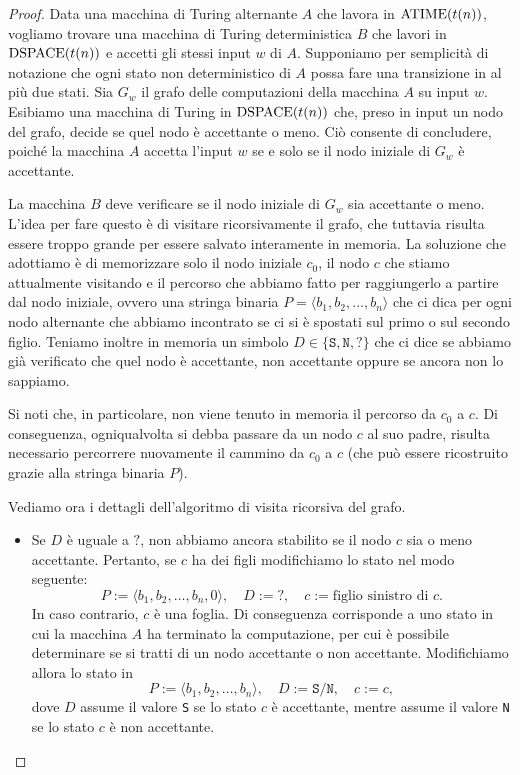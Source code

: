 \begin{proof}
 Data una macchina di Turing alternante $A$ che lavora in $\operatorname{ATIME}(t(n))$, vogliamo trovare
 una macchina di Turing deterministica $B$ che lavori in $\operatorname{DSPACE}(t(n))$ e accetti gli
 stessi input $w$ di $A$. Supponiamo per semplicità di notazione che ogni stato
 non deterministico di $A$ possa fare una transizione in al più due stati.
 Sia $G_w$ il grafo delle computazioni della macchina $A$ su input $w$.
 Esibiamo una macchina di Turing in $\operatorname{DSPACE}(t(n))$ che, preso in input un nodo
 del grafo, decide se quel nodo è accettante o meno. Ciò consente di concludere, poiché
 la macchina $A$ accetta l'input $w$ se e solo se il nodo iniziale
 di $G_w$ è accettante.
 
 La macchina $B$ deve verificare se il nodo iniziale di $G_w$ sia accettante o
 meno. L'idea per fare questo è di visitare ricorsivamente il grafo, che tuttavia
 risulta essere troppo grande per essere salvato interamente in memoria. La soluzione che adottiamo
 è di memorizzare solo il nodo iniziale $c_0$, il nodo $c$ che stiamo attualmente
 visitando e il percorso che abbiamo fatto per raggiungerlo a partire dal nodo
 iniziale, ovvero una stringa binaria $P = \langle b_1, b_2, \ldots, b_n \rangle$
 che ci dica per ogni nodo alternante
 che abbiamo incontrato se ci si è spostati sul primo o sul secondo figlio.
 Teniamo inoltre in memoria un simbolo $D \in \{\texttt{S}, \texttt{N}, \texttt{?}\}$ che ci dice se
 abbiamo già verificato che quel nodo è accettante, non accettante oppure
 se ancora non lo sappiamo.
 
 Si noti che, in particolare, non viene tenuto in memoria il percorso da $c_0$ a $c$.
 Di conseguenza, ogniqualvolta si debba passare da un nodo $c$ al suo padre,
 risulta necessario percorrere nuovamente il cammino da $c_0$ a $c$ (che può essere
 ricostruito grazie alla stringa binaria $P$).
 
 Vediamo ora i dettagli dell'algoritmo di visita ricorsiva del grafo.
 \begin{itemize}
  \item  Se $D$ è uguale a $\texttt{?}$, non abbiamo ancora stabilito se il nodo $c$ sia o meno
  accettante. Pertanto, se $c$ ha dei figli modifichiamo lo stato nel modo seguente:
  \[ P := \langle b_1, b_2, \ldots, b_n, 0 \rangle, \quad D := \texttt{?}, \quad c := \text{figlio sinistro di $c$}. \]
  In caso contrario, $c$ è una foglia. Di conseguenza corrisponde a uno stato in cui la macchina $A$
  ha terminato la computazione, per cui è possibile determinare se si tratti di un
  nodo accettante o non accettante. Modifichiamo allora lo stato in
  \[ P := \langle b_1, b_2, \ldots, b_n \rangle, \quad D := \texttt{S}/\texttt{N}, \quad c := c, \]
  dove $D$ assume il valore \texttt{S} se lo stato $c$ è accettante, mentre assume il valore \texttt{N} se lo stato $c$
  è non accettante.
  

\end{itemize}
\end{proof}

